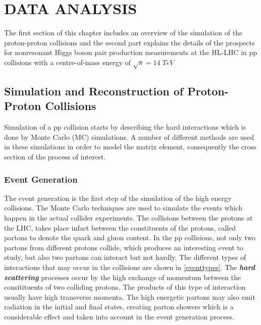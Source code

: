 \chapter{DATA ANALYSIS}\label{ch3}

The first section of this chapter includes an overview of the simulation of the proton-proton collisions and the second part explains the details of the prospects for nonresonant Higgs boson pair production measurements at the HL-LHC in pp collisions with a centre-of-mass energy of $\sqrt{s}=14\;TeV$

\section{Simulation and Reconstruction of Proton-Proton Collisions}

Simulation of a pp collision starts by describing the hard interactions which is done by Monte Carlo (MC) simulations. A number of different methods are used in these simulations in order to model the matrix element, consequently the cross section of the process of interest. 

\subsection{Event Generation}

The event generation is the first step of the simulation of the high energy collisions. The Monte Carlo techniques are used to simulate the events which happen in the actual collider experiments. The collisions between the protons at the LHC, takes place infact between the constituents of the protons, called partons to denote the quark and gluon content. In the pp collisions, not only two partons from different protons collide, which produces an interesting event to study, but also two partons can interact but not hardly. The different types of interactions that may occur in the collisions are shown in \autoref{eventtypes}. The \emph{\bf{hard scattering}} processes occur by the high exchange of momentum between the consitituents of two colliding protons. The products of this type of interaction usually have high transverse momenta. The high energetic partons may also emit radiation in the initial and final states, creating parton showers which is a considerable effect and taken into account in the event generation process.

